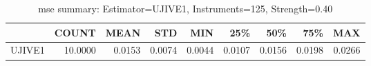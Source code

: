 \begin{table}[ht]
\centering
\caption{mse summary: Estimator=UJIVE1, Instruments=125, Strength=0.40}
\begin{tabular}{lrrrrrrrr}
\toprule
 & COUNT & MEAN & STD & MIN & 25\% & 50\% & 75\% & MAX \\
\midrule
UJIVE1 & 10.0000 & 0.0153 & 0.0074 & 0.0044 & 0.0107 & 0.0156 & 0.0198 & 0.0266 \\
\bottomrule
\end{tabular}
\end{table}
